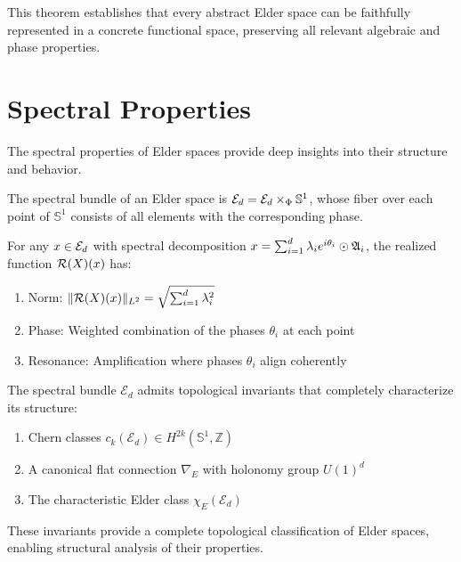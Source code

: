 This theorem establishes that every abstract Elder space can be faithfully represented in a concrete functional space, preserving all relevant algebraic and phase properties.

\section{Spectral Properties}

The spectral properties of Elder spaces provide deep insights into their structure and behavior.

\begin{definition}
The spectral bundle of an Elder space is $\mathcal{E}_d = \mathcal{E}_{d} \times_{\Phi} \mathbb{S}^1$, whose fiber over each point of $\mathbb{S}^1$ consists of all elements with the corresponding phase.
\end{definition}

\begin{lemma}
For any $x \in \mathcal{E}_{d}$ with spectral decomposition $x = \sum_{i=1}^{d} \lambda_i e^{i\theta_i} \odot \mathfrak{A}_{i}$, the realized function $\mathcal{R}(X)(x)$ has:
\begin{enumerate}
    \item Norm: $\|\mathcal{R}(X)(x)\|_{L^2} = \sqrt{\sum_{i=1}^{d} \lambda_i^2}$
    \item Phase: Weighted combination of the phases $\theta_i$ at each point
    \item Resonance: Amplification where phases $\theta_i$ align coherently
\end{enumerate}
\end{lemma}

\begin{theorem}
The spectral bundle $\mathcal{E}_d$ admits topological invariants that completely characterize its structure:
\begin{enumerate}
    \item Chern classes $c_k(\mathcal{E}_d) \in H^{2k}(\mathbb{S}^1, \mathbb{Z})$
    \item A canonical flat connection $\nabla_E$ with holonomy group $U(1)^d$
    \item The characteristic Elder class $\chi_E(\mathcal{E}_d)$
\end{enumerate}
\end{theorem}

These invariants provide a complete topological classification of Elder spaces, enabling structural analysis of their properties.

